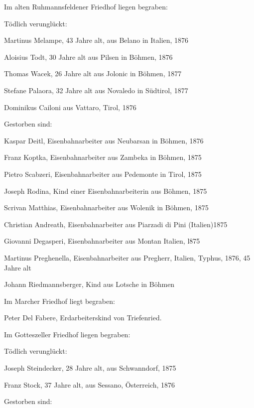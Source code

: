 Im alten Ruhmannsfeldener Friedhof liegen begraben:



Tödlich verunglückt:



Martinus Melampe, 43 Jahre alt, aus Belano in Italien, 1876

Aloisius Todt, 30 Jahre alt aus Pilsen in Böhmen, 1876

Thomas Wacek, 26 Jahre alt aus Jolonic in Böhmen, 1877

Stefane Palaora, 32 Jahre alt aus Novaledo in Südtirol, 1877

Dominikus Cailoni aus Vattaro, Tirol, 1876



Gestorben sind:



Kaspar Deitl, Eisenbahnarbeiter aus Neubarsan in Böhmen, 1876

Franz Koptka, Eisenbahnarbeiter aus Zambeka in Böhmen, 1875

Pietro Scabzeri, Eisenbahnarbeiter aus Pedemonte in Tirol, 1875

Joseph Rodina, Kind einer Eisenbahnarbeiterin aus Böhmen, 1875

Scrivan Matthias, Eisenbahnarbeiter aus Wolenik in Böhmen, 1875

Christian Andreath, Eisenbahnarbeiter aus Piarzadi di Pini (Italien)1875

Giovanni Degasperi, Eisenbahnarbeiter aus Montan Italien, l875

Martinus Preghenella, Eisenbahnarbeiter aus Pregherr, Italien, Typhus, 1876, 45
Jahre alt

Johann Riedmannsberger, Kind aus Lotsche in Böhmen



Im Marcher Friedhof liegt begraben:



Peter Del Fabere, Erdarbeiterskind von Triefenried.



Im Gotteszeller Friedhof liegen begraben:



Tödlich verunglückt:



Joseph Steindecker, 28 Jahre alt, aus Schwanndorf, 1875

Franz Stock, 37 Jahre alt, aus Sessano, Österreich, 1876



Gestorben sind:




